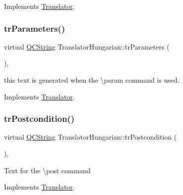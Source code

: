Implements \mbox{\hyperlink{class_translator}{Translator}}.

\mbox{\label{class_translator_hungarian_a46d4cd5c529aaed86d4496c01b63ef1b}} 
\subsubsection{\texorpdfstring{trParameters()}{trParameters()}}
{\footnotesize\ttfamily virtual \mbox{\hyperlink{class_q_c_string}{Q\+C\+String}} Translator\+Hungarian\+::tr\+Parameters (\begin{DoxyParamCaption}{ }\end{DoxyParamCaption})\hspace{0.3cm}{\ttfamily [inline]}, {\ttfamily [virtual]}}

this text is generated when the \textbackslash{}param command is used. 

Implements \mbox{\hyperlink{class_translator}{Translator}}.

\mbox{\label{class_translator_hungarian_a77de26f1cb6558ed2eefc7658b2578d9}} 
\subsubsection{\texorpdfstring{trPostcondition()}{trPostcondition()}}
{\footnotesize\ttfamily virtual \mbox{\hyperlink{class_q_c_string}{Q\+C\+String}} Translator\+Hungarian\+::tr\+Postcondition (\begin{DoxyParamCaption}{ }\end{DoxyParamCaption})\hspace{0.3cm}{\ttfamily [inline]}, {\ttfamily [virtual]}}

Text for the \textbackslash{}post command 

Implements \mbox{\hyperlink{class_translator}{Translator}}.

\mbox{\label{class_translator_hungarian_a8b0383d61cc8cb690551cfd3f553a74f}} 
